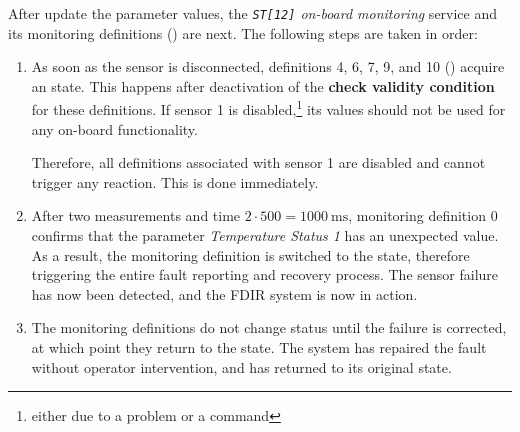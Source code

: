 \documentclass[a4paper,nobib]{tufte-book}
\begin{document}
After update the parameter values, the \emph{\texttt{ST[12]} on-board monitoring} service and its monitoring definitions () are next. The following steps are taken in order:
\begin{enumerate}
	\item As soon as the sensor is disconnected, definitions 4, 6, 7, 9, and 10 () acquire an \invalid{} state. This happens after deactivation of the \textbf{check validity condition} for these definitions. If sensor 1 is disabled,\footnote{either due to a problem or a command} its values should not be used for any on-board functionality.
	
	Therefore, all definitions associated with sensor 1 are disabled and cannot trigger any reaction. This is done immediately.
	\item After two measurements and time \( 2 \cdot 500 = \SI{1000}{\milli\second} \), monitoring definition 0 confirms that the parameter \emph{Temperature Status 1} has an unexpected value. As a result, the monitoring definition is switched to the \unexpected{} state, therefore triggering the entire fault reporting and recovery process. The sensor failure has now been detected, and the \acs{FDIR} system is now in action.
	\item The monitoring definitions do not change status until the failure is corrected, at which point they return to the \ok{} state. The system has repaired the fault without operator intervention, and has returned to its original state.
\end{enumerate}
\end{document}
